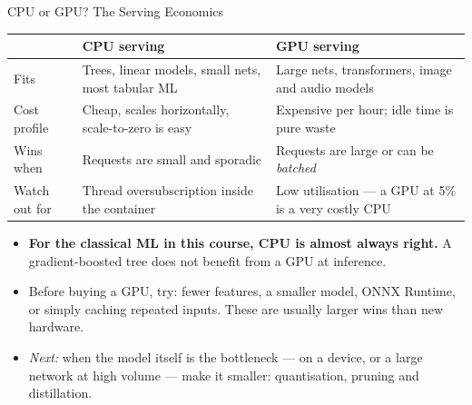 
\begin{frame}{CPU or GPU? The Serving Economics}

    \centering
    \renewcommand{\arraystretch}{1.3}
    {\scriptsize
    \begin{tabular}{p{3.4cm}|p{4.2cm}|p{4.2cm}}
        \toprule
                          & \textbf{CPU serving} & \textbf{GPU serving} \\
        \midrule
        Fits              & Trees, linear models, small nets, most tabular ML & Large nets, transformers,
                            image and audio models \\
        Cost profile      & Cheap, scales horizontally, scale-to-zero is easy & Expensive per hour;
                            idle time is pure waste \\
        Wins when         & Requests are small and sporadic & Requests are large or can be \emph{batched} \\
        Watch out for     & Thread oversubscription inside the container & Low utilisation --- a GPU at 5\%
                            is a very costly CPU \\
        \bottomrule
    \end{tabular}}

    \vspace{0.27em}
    \begin{itemize}
        \item \textbf{For the classical ML in this course, CPU is almost always right.} A gradient-boosted
              tree does not benefit from a GPU at inference.
        \item Before buying a GPU, try: fewer features, a smaller model, ONNX Runtime, or simply caching
              repeated inputs. These are usually larger wins than new hardware.
        \item \textit{Next:} when the model itself is the bottleneck --- on a device, or a large network
              at high volume --- make it smaller: quantisation, pruning and distillation.
    \end{itemize}

\end{frame}
